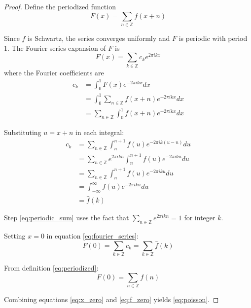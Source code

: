 \documentclass{article}
\begin{document}
\begin{proof}
Define the periodized function
\begin{equation}
\label{eq:periodized}
F(x) = \sum_{n \in \mathbb{Z}} f(x + n)
\end{equation}

Since $f$ is Schwartz, the series converges uniformly and $F$ is periodic with period 1. The Fourier series expansion of $F$ is
\begin{equation}
\label{eq:fourier_series}
F(x) = \sum_{k \in \mathbb{Z}} c_k e^{2\pi i k x}
\end{equation}
where the Fourier coefficients are
\begin{align}
c_k &= \int_0^1 F(x) e^{-2\pi i k x} dx \label{eq:coeff_def}\\
&= \int_0^1 \sum_{n \in \mathbb{Z}} f(x + n) e^{-2\pi i k x} dx \label{eq:coeff_expand}\\
&= \sum_{n \in \mathbb{Z}} \int_0^1 f(x + n) e^{-2\pi i k x} dx \label{eq:interchange}
\end{align}

Substituting $u = x + n$ in each integral:
\begin{align}
c_k &= \sum_{n \in \mathbb{Z}} \int_n^{n+1} f(u) e^{-2\pi i k (u-n)} du \label{eq:substitution}\\
&= \sum_{n \in \mathbb{Z}} e^{2\pi i k n} \int_n^{n+1} f(u) e^{-2\pi i k u} du \label{eq:factor_out}\\
&= \sum_{n \in \mathbb{Z}} \int_n^{n+1} f(u) e^{-2\pi i k u} du \label{eq:periodic_sum}\\
&= \int_{-\infty}^{\infty} f(u) e^{-2\pi i k u} du \label{eq:union_intervals}\\
&= \hat{f}(k) \label{eq:fourier_transform}
\end{align}

Step \eqref{eq:periodic_sum} uses the fact that $\sum_{n \in \mathbb{Z}} e^{2\pi i k n} = 1$ for integer $k$.

Setting $x = 0$ in equation \eqref{eq:fourier_series}:
\begin{equation}
\label{eq:x_zero}
F(0) = \sum_{k \in \mathbb{Z}} c_k = \sum_{k \in \mathbb{Z}} \hat{f}(k)
\end{equation}

From definition \eqref{eq:periodized}:
\begin{equation}
\label{eq:f_zero}
F(0) = \sum_{n \in \mathbb{Z}} f(n)
\end{equation}

Combining equations \eqref{eq:x_zero} and \eqref{eq:f_zero} yields \eqref{eq:poisson}.
\end{proof}
\end{document}
